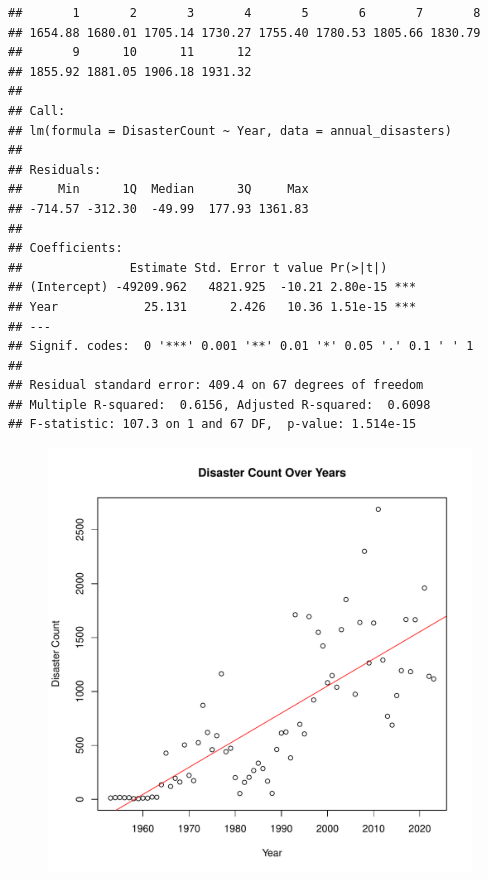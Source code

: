 \documentclass[11pt]{article}\usepackage[]{graphicx}\usepackage[]{xcolor}
\makeatletter
\def\maxwidth{ %
  \ifdim\Gin@nat@width>\linewidth
    \linewidth
  \else
    \Gin@nat@width
  \fi
}
\newenvironment{kframe}{%
 \def\at@end@of@kframe{}%
 \ifinner\ifhmode%
  \def\at@end@of@kframe{\end{minipage}}%
  \begin{minipage}{\columnwidth}%
 \fi\fi%
 \def\FrameCommand##1{\hskip\@totalleftmargin \hskip-\fboxsep
 \colorbox{shadecolor}{##1}\hskip-\fboxsep
     \hskip-\linewidth \hskip-\@totalleftmargin \hskip\columnwidth}%
 \MakeFramed {\advance\hsize-\width
   \@totalleftmargin\z@ \linewidth\hsize
   \@setminipage}}%
 {\par\unskip\endMakeFramed%
 \at@end@of@kframe}
\newenvironment{knitrout}{}{} %
\makeatother
\begin{document}
\clearpage
\begin{knitrout}
\color{fgcolor}\begin{kframe}
\begin{verbatim}
##       1       2       3       4       5       6       7       8 
## 1654.88 1680.01 1705.14 1730.27 1755.40 1780.53 1805.66 1830.79 
##       9      10      11      12 
## 1855.92 1881.05 1906.18 1931.32
## 
## Call:
## lm(formula = DisasterCount ~ Year, data = annual_disasters)
## 
## Residuals:
##     Min      1Q  Median      3Q     Max 
## -714.57 -312.30  -49.99  177.93 1361.83 
## 
## Coefficients:
##               Estimate Std. Error t value Pr(>|t|)    
## (Intercept) -49209.962   4821.925  -10.21 2.80e-15 ***
## Year            25.131      2.426   10.36 1.51e-15 ***
## ---
## Signif. codes:  0 '***' 0.001 '**' 0.01 '*' 0.05 '.' 0.1 ' ' 1
## 
## Residual standard error: 409.4 on 67 degrees of freedom
## Multiple R-squared:  0.6156,	Adjusted R-squared:  0.6098 
## F-statistic: 107.3 on 1 and 67 DF,  p-value: 1.514e-15
\end{verbatim}
\end{kframe}
\end{knitrout}

\begin{figure}[h!]
\centering
  \begin{minipage}{.8\linewidth}
\begin{knitrout}
\color{fgcolor}
\includegraphics[width=\maxwidth]{figure/plot_data_points-1} 
\end{knitrout}
  \label{figure:2}
  \end{minipage}
\end{figure}
\end{document}

